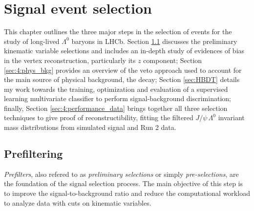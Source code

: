 \chapter{Signal event selection}
\label{cap:event_selection}
This chapter outlines the three major steps in the selection of \demonstratorshort events for the study of long-lived $\Lambda^0$ baryons in LHCb.
Section \ref{sec:prefilter} discusses the preliminary kinematic variable selections and includes an in-depth study of evidences of bias in the \lambdadecay vertex reconstruction, particularly its $z$ component;
Section \ref{sec:4:phys_bkg} provides an overview of the veto approach used to account for the main source of physical background, the \demonstratorshort decay;
Section \ref{sec:HBDT} details my work towards the training, optimization and evaluation of a supervised learning multivariate classifier to perform signal-background discrimination;
finally, Section \ref{sec:4:performance_data} brings together all three selection techniques to give proof of \demonstratorshort reconstructibility, fitting the filtered $J/\psi\,\Lambda^0$ invariant mass distributions from simulated signal and Run 2 data.

\section{Prefiltering}
\label{sec:prefilter}
\textit{Prefilters}, also refered to as \textit{preliminary selections} or simply \textit{pre-selections}, are the foundation of the signal selection process.
The main objective of this step is to improve the signal-to-background ratio and reduce the computational workload to analyze data with cuts on kinematic variables.

